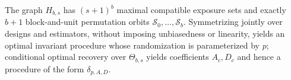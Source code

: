 The graph \(H_{b,s}\) has \((s+1)^b\) maximal compatible exposure sets and exactly \(b+1\) block-and-unit permutation orbits \(\mathcal S_0,\ldots,\mathcal S_b\). Symmetrizing jointly over designs and estimators, without imposing unbiasedness or linearity, yields an optimal invariant procedure whose randomization is parameterized by \(p\); conditional optimal recovery over \(\Theta_{b,s}\) yields coefficients \(A_c,D_c\) and hence a procedure of the form \(\delta_{p,A,D}\).